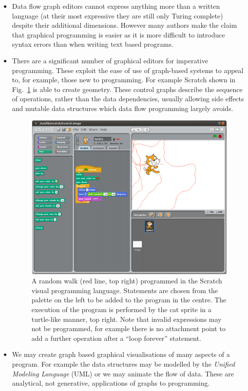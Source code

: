 \begin{itemize}
\item Data flow graph editors cannot express anything more than a written language (at their most expressive they are still only Turing complete) despite their additional dimensions. However many authors make the claim that graphical programming is easier as it is more difficult to introduce syntax errors than when writing text based programs.

\item There are a significant number of graphical editors for imperative  programming\cite{Tanimoto86,blockly}. These exploit the ease of use of graph-based systems to appeal to, for example, those new to programming. For example Scratch\cite{Resnick09} shown in Fig.~\ref{fig:scratch} is able to create geometry. These control graphs describe the sequence of operations, rather than the data dependencies, usually allowing side effects and mutable data structures which data flow programming largely avoids.

\begin{figure}
\centering
\includegraphics[width = 0.5\columnwidth]{scratch.png}
\caption[The Scratch visual programming language]{A random walk (red line, top right) programmed in the Scratch visual programming language\cite{Resnick09}. Statements are chosen from the palette on the left to be added to the program in the centre. The execution of the program is performed by the cat sprite in a turtle-like manner, top right. Note that invalid expressions may not be programmed, for example there is no attachment point to add a further operation after a ``loop forever'' statement.}
\label{fig:scratch}
\end{figure}

\item We may create graph based graphical visualisations of many aspects of a program. For example the data structures may be modelled by the \emph{Unified Modeling Language} (UML) or we may animate the flow of data\cite{Shizuki00}. These are analytical, not generative, applications of graphs to programming.
\end{itemize}

